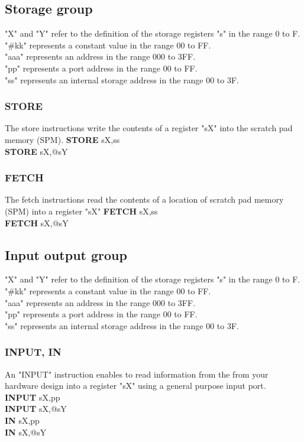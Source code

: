         \subsection{Storage group}
            "X" and "Y" refer to the definition of the storage registers "s" in the range 0 to F.\\
            "\#kk" represents a constant value in the range 00 to FF.\\
            "aaa" represents an address in the range 000 to 3FF.\\
            "pp" represents a port address in the range 00 to FF.\\
            "ss" represents an internal storage address in the range 00 to 3F.\\
        \subsubsection{STORE}
            The store instructions write the contents of a register "sX" into the scratch pad memory (SPM).
                \textbf{STORE} sX,ss\\
                \textbf{STORE} sX,@sY\\

        \subsubsection{FETCH}
            The fetch instructions read the contents of a location of scratch pad memory (SPM) into a register "sX"
                \textbf{FETCH} sX,ss\\
                \textbf{FETCH} sX,@sY\\

        \subsection{Input output group}
            "X" and "Y" refer to the definition of the storage registers "s" in the range 0 to F.\\
            "\#kk" represents a constant value in the range 00 to FF.\\
            "aaa" represents an address in the range 000 to 3FF.\\
            "pp" represents a port address in the range 00 to FF.\\
            "ss" represents an internal storage address in the range 00 to 3F.\\
        \subsubsection{INPUT, IN}
            An "INPUT" instruction enables to read information from the from your hardware design into a register "sX" using a general purpose input port.\\
                \textbf{INPUT}      sX,pp\\
                \textbf{INPUT}      sX,@sY\\
                \textbf{IN}         sX,pp\\
                \textbf{IN}         sX,@sY\\

